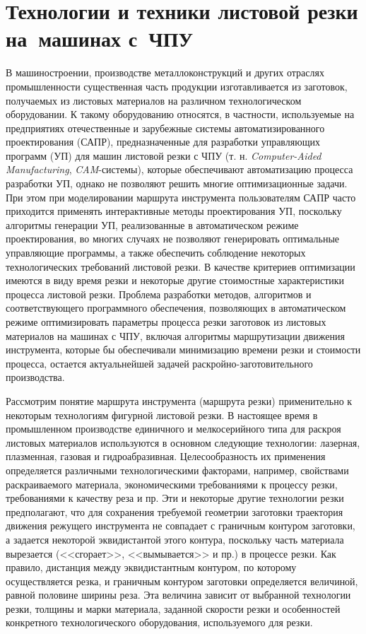 
\section{
  Технологии и техники листовой резки
  на~машинах с~ЧПУ
}
\label{sect:1.1}
\setcounter{equation}{0}

В машиностроении,
производстве металлоконструкций
и других отраслях промышленности существенная часть продукции
изготавливается из заготовок,
получаемых из листовых материалов на различном технологическом оборудовании.
К такому оборудованию относятся, в частности,
используемые на предприятиях отечественные и зарубежные
системы автоматизированного проектирования (САПР),
предназначенные для разработки управляющих программ (УП)
для машин листовой резки с ЧПУ
(т. н. \textit{Computer-Aided Manufacturing},
\textit{CAM}-системы),
которые
обеспечивают автоматизацию процесса разработки УП,
однако не позволяют решить многие оптимизационные задачи.
При этом при моделировании маршрута инструмента пользователям
САПР часто приходится применять интерактивные методы проектирования УП,
поскольку алгоритмы генерации УП,
реализованные в автоматическом режиме проектирования,
во многих случаях не позволяют генерировать оптимальные управляющие программы,
а также обеспечить соблюдение некоторых технологических требований листовой резки.
В качестве критериев оптимизации имеются в виду время резки и
некоторые другие стоимостные характеристики процесса листовой резки.
Проблема разработки методов, алгоритмов и соответствующего программного обеспечения,
позволяющих в автоматическом режиме оптимизировать параметры
процесса резки заготовок из листовых материалов на машинах с ЧПУ,
включая алгоритмы маршрутизации движения инструмента,
которые бы обеспечивали минимизацию времени резки и стоимости процесса,
остается актуальнейшей задачей раскройно-заготовительного производства.

Рассмотрим понятие маршрута инструмента (маршрута резки)
применительно к некоторым технологиям фигурной листовой резки.
В настоящее время в промышленном производстве
единичного и мелкосерийного типа для раскроя листовых материалов
используются в основном следующие технологии:
лазерная, плазменная, газовая и гидроабразивная.
Целесообразность их применения определяется различными технологическими факторами,
например, свойствами раскраиваемого материала,
экономическими требованиями к процессу резки,
требованиями к качеству реза и пр.
Эти и некоторые другие технологии резки предполагают,
что для сохранения требуемой геометрии заготовки
траектория движения режущего инструмента не совпадает
с граничным контуром заготовки,
а задается некоторой эквидистантой этого контура,
поскольку часть материала вырезается (<<сгорает>>, <<вымывается>> и пр.)
в процессе резки.
Как правило, дистанция между эквидистантным контуром,
по которому осуществляется резка, и граничным контуром заготовки определяется величиной,
равной половине ширины реза.
Эта величина зависит от выбранной технологии резки,
толщины и марки материала, заданной скорости резки
и особенностей конкретного технологического оборудования,
используемого для резки.

